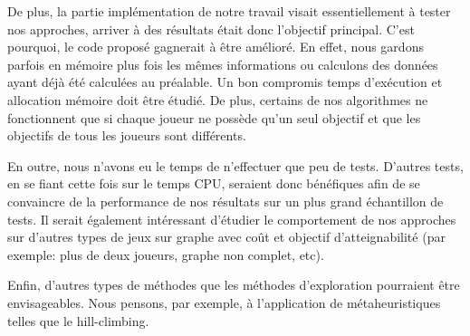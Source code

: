 De plus, la partie implémentation de notre travail visait essentiellement à tester nos approches, arriver à des résultats était donc l'objectif principal. C'est pourquoi, le code proposé gagnerait à être amélioré. En effet, nous gardons parfois en mémoire plus fois les mêmes informations ou calculons des données ayant déjà été calculées au préalable. Un bon compromis temps d'exécution et allocation mémoire doit être étudié. De plus, certains de nos algorithmes ne fonctionnent que si chaque joueur ne possède qu'un seul objectif et que les objectifs de tous les joueurs sont différents.

En outre, nous n'avons eu le temps de n'effectuer que peu de tests. D'autres tests, en se fiant cette fois sur le temps CPU, seraient donc bénéfiques afin de se convaincre de la performance de nos résultats sur un plus grand échantillon de tests. Il serait également intéressant d'étudier le comportement de nos approches sur d'autres types de jeux sur graphe avec coût et objectif d'atteignabilité  (par exemple: plus de deux joueurs, graphe non complet, etc).

Enfin, d'autres types de méthodes que les méthodes d'exploration pourraient être envisageables. Nous pensons, par exemple, à l'application de métaheuristiques telles que le hill-climbing.

